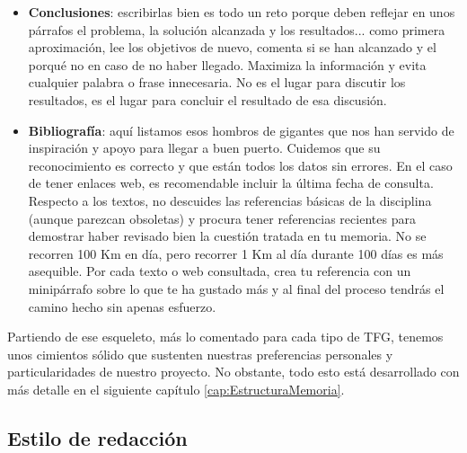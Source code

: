 \begin{itemize}
    \item \textbf{Conclusiones}: escribirlas bien es todo un reto porque deben reflejar en unos párrafos el problema, la solución alcanzada y los resultados... como primera aproximación, lee los objetivos de nuevo, comenta si se han alcanzado y el porqué no en caso de no haber llegado. Maximiza la información y evita cualquier palabra o frase innecesaria. No es el lugar para discutir los resultados, es el lugar para concluir el resultado de esa discusión. 

    \item \textbf{Bibliografía}: aquí listamos esos hombros de gigantes que nos han servido de inspiración y apoyo para llegar a buen puerto. Cuidemos que su reconocimiento es correcto y que están todos los datos sin errores. En el caso de tener enlaces web, es recomendable incluir la última fecha de consulta. Respecto a los textos, no descuides las referencias básicas de la disciplina (aunque parezcan obsoletas) y procura tener referencias recientes para demostrar haber revisado bien la cuestión tratada en tu memoria. No se recorren 100 Km en día, pero recorrer 1 Km al día durante 100 días es más asequible. Por cada texto o web consultada, crea tu referencia con un minipárrafo sobre lo que te ha gustado más y al final del proceso tendrás el camino hecho sin apenas esfuerzo.
    
\end{itemize}

Partiendo de ese esqueleto, más lo comentado para cada tipo de TFG, tenemos unos cimientos sólido que sustenten nuestras preferencias personales y particularidades de nuestro proyecto. No obstante, todo esto está desarrollado con más detalle en el siguiente capítulo \ref{cap:EstructuraMemoria}.

\subsection{Estilo de redacción} %



